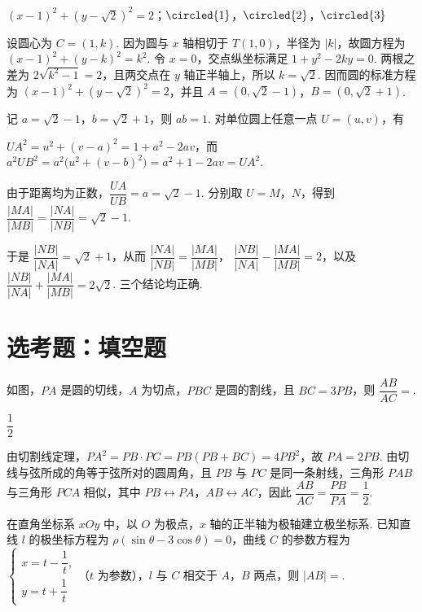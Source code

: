 \begin{answer}
\((x-1)^2+(y-\sqrt{2})^2=2\)；\(\circled{1}\)，\(\circled{2}\)，\(\circled{3}\)
\end{answer}

\begin{solution}
设圆心为 \(C=(1,k)\). 因为圆与 \(x\) 轴相切于 \(T(1,0)\)，半径为 \(|k|\)，故圆方程为 \((x-1)^2+(y-k)^2=k^2\). 令 \(x=0\)，交点纵坐标满足
\(1+y^2-2ky=0\). 两根之差为 \(2\sqrt{k^2-1}=2\)，且两交点在 \(y\) 轴正半轴上，所以 \(k=\sqrt2\). 因而圆的标准方程为 \((x-1)^2+(y-\sqrt2)^2=2\)，并且
\(A=(0,\sqrt2-1)\)，\(B=(0,\sqrt2+1)\).

记 \(a=\sqrt2-1\)，\(b=\sqrt2+1\)，则 \(ab=1\). 对单位圆上任意一点 \(U=(u,v)\)，有

\(UA^2=u^2+(v-a)^2=1+a^2-2av\)，而
\(a^2UB^2=a^2\bigl(u^2+(v-b)^2\bigr)=a^2+1-2av=UA^2\).

由于距离均为正数，\(\dfrac{UA}{UB}=a=\sqrt2-1\). 分别取 \(U=M\)，\(N\)，得到
\(\dfrac{|MA|}{|MB|}=\dfrac{|NA|}{|NB|}=\sqrt2-1\).

于是 \(\dfrac{|NB|}{|NA|}=\sqrt2+1\)，从而
\(\dfrac{|NA|}{|NB|}=\dfrac{|MA|}{|MB|}\)，
\(\dfrac{|NB|}{|NA|}-\dfrac{|MA|}{|MB|}=2\)，以及
\(\dfrac{|NB|}{|NA|}+\dfrac{|MA|}{|MB|}=2\sqrt2\). 三个结论均正确.
\end{solution}

\section{选考题：填空题}

\begin{problem}
如图，\(PA\) 是圆的切线，\(A\) 为切点，\(PBC\) 是圆的割线，且 \(BC=3PB\)，则 \(\dfrac{AB}{AC}=\)\fillinblank{}.
\end{problem}

\begin{answer}
\(\dfrac{1}{2}\)
\end{answer}

\begin{solution}
由切割线定理，\(PA^2=PB\cdot PC=PB(PB+BC)=4PB^2\)，故 \(PA=2PB\). 由切线与弦所成的角等于弦所对的圆周角，且 \(PB\) 与 \(PC\) 是同一条射线，三角形 \(PAB\) 与三角形 \(PCA\) 相似，其中 \(PB\leftrightarrow PA\)，\(AB\leftrightarrow AC\)，因此
\(\dfrac{AB}{AC}=\dfrac{PB}{PA}=\dfrac12\).
\end{solution}

\begin{problem}
在直角坐标系 \(xOy\) 中，以 \(O\) 为极点，\(x\) 轴的正半轴为极轴建立极坐标系. 已知直线 \(l\) 的极坐标方程为 \(\rho(\sin\theta-3\cos\theta)=0\)，曲线 \(C\) 的参数方程为 \(\begin{cases}
x=t-\dfrac1t,\\
y=t+\dfrac1t
\end{cases}\)（\(t\) 为参数），\(l\) 与 \(C\) 相交于 \(A\)，\(B\) 两点，则 \(|AB|=\)\fillinblank{}.
\end{problem}

